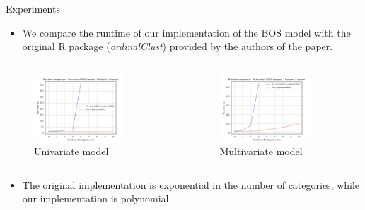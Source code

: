 \documentclass{beamer}
\begin{document}
\begin{frame}{Experiments}
    \begin{itemize}
        \item We compare the runtime of our implementation of the BOS model with the original R package (\textit{ordinalClust}) provided by the authors of the paper.
    \end{itemize}

    \begin{columns}

    \begin{figure}[htpb]
        \centering
        \includegraphics[width=0.8\textwidth]{python_figures/run_time_comparison_univariate.png}
        \caption*{Univariate model}
        \label{fig:runtimes_univariate}
    \end{figure}

    \begin{figure}[htpb]
        \centering
        \includegraphics[width=0.8\textwidth]{python_figures/run_time_comparison_multivariate.png}
        \caption*{Multivariate model}
        \label{fig:runtimes_multivariate}
    \end{figure}
        
    \end{columns}

    \begin{itemize}
        \item The original implementation is exponential in the number of categories, while our implementation is polynomial.
    \end{itemize}

\end{frame}
\end{document}
